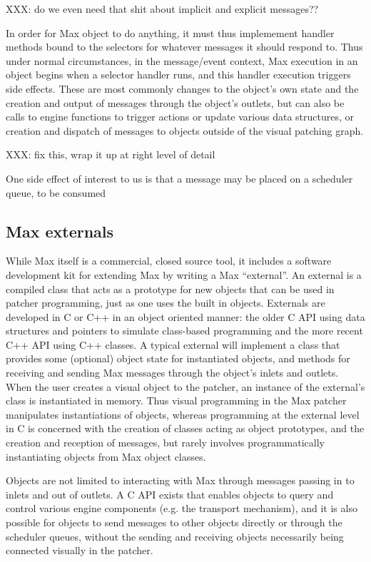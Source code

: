 \documentclass[acmsmall]{acmart}
\begin{document}
XXX: do we even need that shit about implicit and explicit messages??

In order for Max object to do anything, it must thus implemement handler methods bound to the selectors
for whatever messages it should respond to. 
Thus under normal circumstances, in the message/event context, Max execution in an object begins when
a selector handler runs, and this handler execution triggers side effects. These are most commonly
changes to the object's own state and the creation and output of messages through the object's 
outlets, but can also be calls to engine functions to trigger actions or update various
data structures, or creation and dispatch of messages to objects outside of the visual patching graph.

XXX: fix this, wrap it up at right level of detail
 
One side effect of interest to us is that a message may be placed on a scheduler queue, to be consumed

\subsection{Max externals}
While Max itself is a commercial, closed source tool, it includes a software development kit for 
extending Max by writing a Max “external”. An external is a compiled class that acts as a prototype 
for new objects that can be used in patcher programming, just as one uses the built in objects.
Externals are developed in C or C++ in an object oriented manner: the older C API using data 
structures and pointers to simulate class-based programming and the more recent C++ API using C++ classes.
A typical external will implement a class that provides some (optional) object state for instantiated
objects, and 
methods for receiving and sending Max messages through the object’s inlets and outlets. When the user 
creates a visual object to the patcher, an instance of the external’s class is instantiated in memory.
Thus visual programming in the Max patcher manipulates instantiations of objects, whereas programming
at the external level in C is concerned with the creation of classes acting as object prototypes, and
the creation and reception of messages, but rarely involves programmatically instantiating objects 
from Max object classes.

Objects are not limited to interacting with Max through messages passing in to inlets and out of 
outlets. A C API exists that enables objects to query and control various engine components (e.g. 
the transport mechanism), and it is also possible for objects to send messages to other objects 
directly or through the scheduler queues, without the sending and receiving objects 
necessarily being connected visually in the patcher. 
\end{document}
